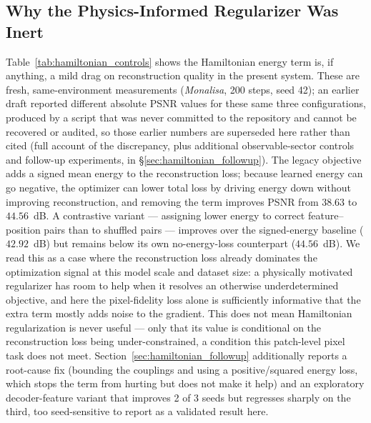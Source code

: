 \documentclass[11pt]{article}
\begin{document}
\subsection{Why the Physics-Informed Regularizer Was Inert}
\label{sec:regularizer_inert}
Table~\ref{tab:hamiltonian_controls} shows the Hamiltonian energy term is, if anything, a mild drag on reconstruction quality in the present system. These are fresh, same-environment measurements (\textit{Monalisa}, 200 steps, seed 42); an earlier draft reported different absolute PSNR values for these same three configurations, produced by a script that was never committed to the repository and cannot be recovered or audited, so those earlier numbers are superseded here rather than cited (full account of the discrepancy, plus additional observable-sector controls and follow-up experiments, in \S\ref{sec:hamiltonian_followup}). The legacy objective adds a signed mean energy to the reconstruction loss; because learned energy can go negative, the optimizer can lower total loss by driving energy down without improving reconstruction, and removing the term improves PSNR from $38.63$ to $44.56$~dB. A contrastive variant --- assigning lower energy to correct feature--position pairs than to shuffled pairs --- improves over the signed-energy baseline ($42.92$~dB) but remains below its own no-energy-loss counterpart ($44.56$~dB). We read this as a case where the reconstruction loss already dominates the optimization signal at this model scale and dataset size: a physically motivated regularizer has room to help when it resolves an otherwise underdetermined objective, and here the pixel-fidelity loss alone is sufficiently informative that the extra term mostly adds noise to the gradient. This does not mean Hamiltonian regularization is never useful --- only that its value is conditional on the reconstruction loss being under-constrained, a condition this patch-level pixel task does not meet. Section~\ref{sec:hamiltonian_followup} additionally reports a root-cause fix (bounding the couplings and using a positive/squared energy loss, which stops the term from hurting but does not make it help) and an exploratory decoder-feature variant that improves 2 of 3 seeds but regresses sharply on the third, too seed-sensitive to report as a validated result here.
\end{document}
